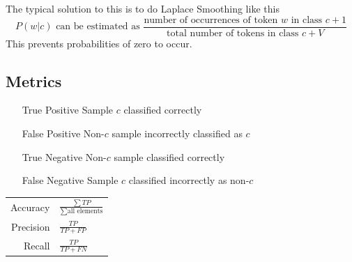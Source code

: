 \documentclass[11pt]{article}
\begin{document}
The typical solution to this is to do Laplace Smoothing like this
\begin{equation*}
	P(w|c)\text{ can be estimated as }\frac{\text{number of occurrences of token $w$ in class } c + 1}{\text{total number of tokens in class } c+V}
\end{equation*}
This prevents probabilities of zero to occur.

\subsection{Metrics}
\begin{itemize}[leftmargin=*, labelindent=3cm, labelsep=1cm]
	\item[True Positive] Sample $c$ classified correctly
	\item[False Positive] Non-$c$ sample incorrectly classified as $c$
	\item[True Negative] Non-$c$ sample classified correctly
	\item[False Negative] Sample $c$ classified incorrectly as non-$c$
\end{itemize}

\begin{tabularx}{\linewidth}{rX}
	Accuracy & $ \frac{\sum TP}{\sum \text{all elements}} $ \\
	Precision & $\frac{TP}{TP + FP}$\\
	Recall & $ \frac{TP}{TP + FN} $\\
\end{tabularx}
\end{document}
